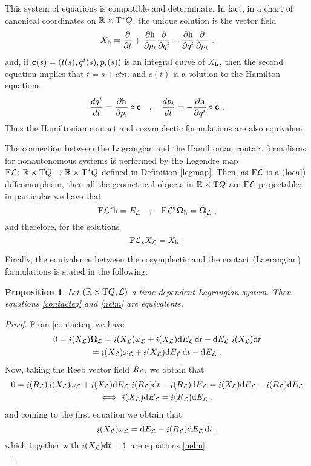 \documentclass[12pt]{report}
\newtheorem{prop}[teor]{Proposition}
\def\derpar#1#2{\frac{\partial{#1}}{\partial{#2}}}
\def\qed{\ifvmode\removelastskip\fi
{\unskip\nobreak\hfil\penalty50\hbox{}\nobreak\hfil
\hbox{\vrule height1.2ex width1.2ex}\parfillskip=0pt
\finalhyphendemerits=0 \par\smallskip}}
\def\Lag{{\cal L}}
\def\d{{\rm d}}
\def\Real{\mathbb{R}}
\def\Tan{{\rm T}}
\def\inn{\mathop{i}\nolimits}
\begin{document}
This system of equations is compatible and determinate.
In fact, in a chart of canonical coordinates  on $\Real\times\Tan^*Q$,
the unique solution is the vector field
$$
X_{\rm h} =\derpar{}{t}+ \derpar{{\rm h}}{p_i} \derpar{}{q^i} -
      \derpar{{\rm h}}{q^i} \derpar{}{p_i} \ .
$$
and, if ${\bf c}(s)=(t(s),q^i(s), p_i(s))$ is an integral curve of $X_{\rm h}$,
then the second equation implies that $t=s+ctn.$ and $c(t)$
is a solution to the Hamilton equations
\[
\frac{dq^i}{dt} = \frac{\partial {\rm h}}{\partial p_i}\circ{\bf c} \quad ,\quad 
\frac{dp_i}{dt}= -\frac{\partial {\rm h}}{\partial q^i}\circ{\bf c}\ .
\]
Thus the Hamiltonian contact and cosymplectic formulations are also equivalent. 

The connection between the Lagrangian and the
Hamiltonian contact formalisms for nonautonomous systems is performed by the Legendre map
${\rm F}\Lag\colon\Real\times\Tan Q \to \Real\times\Tan^*Q$
defined in Definition \ref{legmap}.
Then, as ${\rm F}\Lag$  is a (local) diffeomorphism,
then all the geometrical objects in
$\Real\times\Tan Q$ are ${\rm F}\Lag$-projectable;
in particular we have that
$$
{\rm F}\Lag^*{\rm h}=E_\Lag \quad ; \quad
{\rm F}\Lag^*\mbox{\boldmath $\Omega$}_{\rm h} =\mbox{\boldmath $\Omega$}_{\cal L} \ ,
$$
and therefore, for the solutions
$$
{\rm F}\Lag_*X_{\cal L} = X_{\rm h} \ .
$$

Finally, the equivalence between the cosymplectic and the contact (Lagrangian) formulations is stated in the following:

\begin{prop}
Let $(\Real\times\Tan Q,\Lag)$ a time-dependent Lagrangian system.
Then equations \eqref{contacteq} and \eqref{nelm} are equivalents.
\end{prop}
\begin{proof}
From \eqref{contacteq} we have
\begin{multline*}
0=\inn(X_{\cal L})\mbox{\boldmath $\Omega$}_\Lag =
\inn(X_{\cal L})\omega_\Lag+ \inn(X_{\cal L})\d E_\Lag\,\d t-
\d E_\Lag\, \inn(X_{\cal L})\d t \\
=\inn(X_{\cal L})\omega_\Lag+ \inn(X_{\cal L})\d E_\Lag\,\d t-
\d E_\Lag \ .
\end{multline*}
  Now, taking the Reeb vector field $R_\Lag$, we obtain that
\begin{multline*}
0=\inn(R_\Lag)\inn(X_{\cal L})\omega_\Lag+ \inn(X_{\cal L})\d E_\Lag\,\inn(R_\Lag)\d t-\inn(R_\Lag)\d E_\Lag=
 \inn(X_{\cal L})\d E_\Lag-\inn(R_\Lag)\d E_\Lag \\
 \Longleftrightarrow \ \inn(X_{\cal L})\d E_\Lag=\inn(R_\Lag)\d E_\Lag \ ,
\end{multline*}
and coming to the first equation we obtain that
$$
\inn(X_{\cal L})\omega_\Lag=
\d E_\Lag- \inn(R_{\cal L})\d E_\Lag\,\d t \ ,
$$
which together with $\inn(X_{\cal L})\d t=1$ are equations \eqref{nelm}.
\\ \qed\end{proof}
\end{document}

